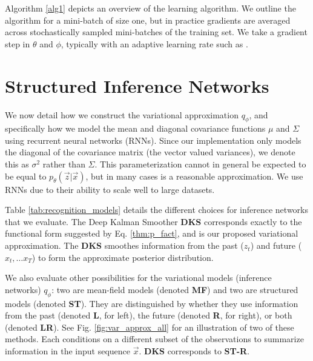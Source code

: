 \documentclass[letterpaper]{article}
\newcommand{\pth}{p_\theta}
\newcommand{\qph}{q_\phi}
\newcommand{\vecx}{\vec{x}}
\theoremstyle{plain}
\newcommand{\citet}{\cite}
\newcommand{\DKS}{\textbf{DKS}\xspace}
\begin{document}
Algorithm \ref{alg1} depicts an overview of the learning algorithm.
We outline the algorithm for a mini-batch of size one, 
but in practice gradients are averaged across stochastically sampled mini-batches of the training set.
We take a gradient step in $\theta$ and
$\phi$, typically with an adaptive learning rate such as
\citet{kingma2014adam}. 
 \section{Structured Inference Networks\label{sec:opt_q}}


We now detail how 
we construct the variational approximation $q_\phi$, and specifically 
how we model the mean and diagonal covariance functions $\mu$ and $\Sigma$ using recurrent neural networks (RNNs).
Since our implementation only models the diagonal of the covariance matrix (the vector valued variances), we denote this as $\sigma^2$ rather
than $\Sigma$.
This parameterization cannot in general be expected 
to be equal to $\pth(\vec{z}|\vec{x})$, but in many cases is a reasonable approximation. 
We use RNNs due to their ability to scale well to large datasets. 

Table \ref{tab:recognition_models} details
the different choices for inference networks that we evaluate.
The Deep Kalman Smoother \textbf{\DKS} corresponds exactly to the functional form suggested by Eq. \ref{thm:p_fact}, and is our proposed variational approximation. The \DKS smoothes 
information from the past ($z_t$) and future ($x_t, \ldots x_{T}$) to form the approximate posterior distribution. 

We also evaluate other possibilities for the variational models (inference
networks) $\qph$: two are mean-field models (denoted \textbf{MF}) and
two are structured models (denoted \textbf{ST}). They are
distinguished by whether they use information from the past (denoted
\textbf{L}, for left), the future (denoted \textbf{R}, for right), or
both (denoted \textbf{LR}). See Fig. \ref{fig:var_approx_all} for an
illustration of two of these methods.
Each conditions on a different subset of the observations
to summarize information in the input sequence $\vecx$. 
\DKS corresponds to \textbf{ST-R}. 
\end{document}
